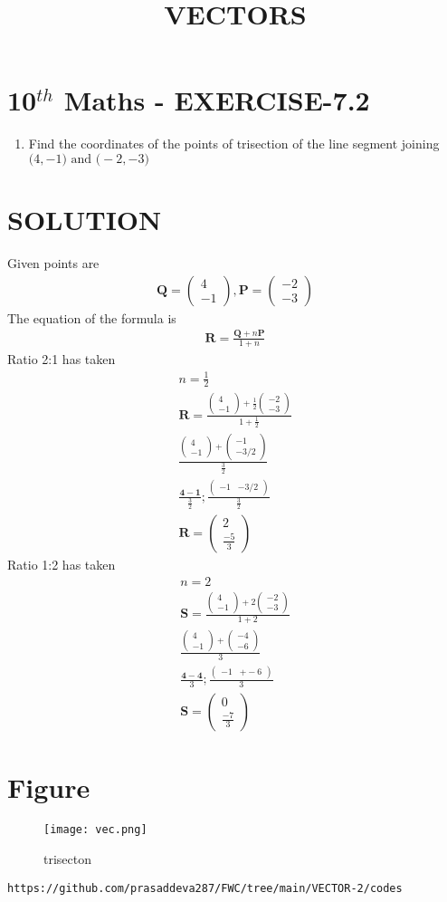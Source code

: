 \documentclass[12pt]{article}
\newcommand{\myvec}[1]{\ensuremath{\begin{pmatrix}#1\end{pmatrix}}}
\let\vec\mathbf
\begin{document}
\begin{center}
\title{\textbf{VECTORS}}
\date{\vspace{-5ex}} %
\maketitle
\end{center}

\section{10$^{th}$ Maths - EXERCISE-7.2}

\begin{enumerate}
\item Find the coordinates of the points of trisection of the line segment joining $\vec(4 ,-1) \text{ and } \vec(-2,-3)$ 
\end{enumerate}

\section{SOLUTION}
Given points are
\begin{align}
\vec{Q}=\myvec{4\\ -1} ,
\vec{P}=\myvec{-2\\ -3}
\end{align}
The equation of the formula is
\begin{align}
\vec{R}=\frac{\vec{Q}+n\vec{P}}{1+n}
\end{align}
Ratio 2:1 has taken 
\begin{align}
n=\frac{1}{2}\\
\vec{R}=\frac{\myvec{4\\-1}+\frac{1}{2}\myvec{-2\\-3}}{1+\frac{1}{2}} \\
\frac{\myvec{4\\-1}+\myvec{-1\\-3/2}}{\frac{3}{2}}\\
\frac{\vec{4-1}}{\frac{3}{2}};\frac{\myvec{-1& -3/2}}{\frac{3}{2}}\\
\vec{R}=\myvec{2 \\ \frac{-5}{3}}
\end{align}
Ratio 1:2 has taken
\begin{align}
n=2\\
\vec{S}=\frac{\myvec{4\\ -1}+2\myvec{-2\\ -3}}{1+2} \\
\frac{\myvec{4\\ -1}+\myvec{-4\\ -6}}{3}\\
\frac{\vec{4-4}}{3};\frac{\myvec{-1&+-6}}{3}\\
\vec{S}=\myvec{0\\ \frac{-7}{3}}
\end{align}

\section{Figure}
\begin{figure}[h]
\centering
\texttt{[image: vec.png]}
\caption{trisecton}
		\label{fig:Figure}
\end{figure}
\begin{lstlisting}
https://github.com/prasaddeva287/FWC/tree/main/VECTOR-2/codes
\end{lstlisting}
\end{document}
